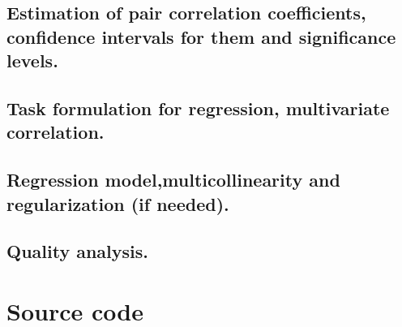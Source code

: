 \documentclass[%
12pt, %
final, %
oneside, %
onecolumn, %
centertags]{article} %
\theoremstyle{plain}
\theoremstyle{definition}
\theoremstyle{remark}
\begin{document}
\subsection{Estimation of pair correlation coefficients, confidence intervals for them and significance levels.}

\subsection{Task formulation for regression, multivariate correlation.}

\subsection{Regression model,multicollinearity and regularization (if needed).}

\subsection{Quality analysis.}

\section{Source code}
\end{document}
